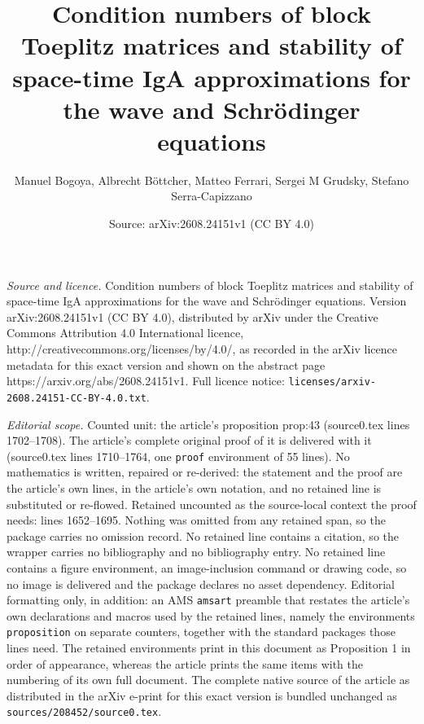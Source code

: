 \documentclass[10pt,a4paper]{amsart}
\title{Condition numbers of block Toeplitz matrices and stability of space-time IgA approximations for the wave and Schrödinger equations}
\author{Manuel Bogoya, Albrecht B\"ottcher, Matteo Ferrari, Sergei M Grudsky, Stefano Serra-Capizzano}
\date{Source: arXiv:2608.24151v1 (CC BY 4.0)}
\begin{document}
\maketitle

\noindent\emph{Source and licence.} Condition numbers of block Toeplitz matrices and stability of space-time IgA approximations for the wave and Schrödinger equations. Version arXiv:2608.24151v1 (CC BY 4.0), distributed by arXiv under the Creative Commons Attribution 4.0 International licence, http://creativecommons.org/licenses/by/4.0/, as recorded in the arXiv licence metadata for this exact version and shown on the abstract page https://arxiv.org/abs/2608.24151v1. Full licence notice: \texttt{licenses/arxiv-2608.24151-CC-BY-4.0.txt}.\par\smallskip

\noindent\textit{Editorial scope.} Counted unit: the article's proposition prop:43 (source0.tex lines 1702--1708). The article's complete original proof of it is delivered with it (source0.tex lines 1710--1764, one \texttt{proof} environment of 55 lines). No mathematics is written, repaired or re-derived: the statement and the proof are the article's own lines, in the article's own notation, and no retained line is substituted or re-flowed.  Retained uncounted as the source-local context the proof needs: lines 1652--1695.  Nothing was omitted from any retained span, so the package carries no omission record.  No retained line contains a citation, so the wrapper carries no bibliography and no bibliography entry.  No retained line contains a figure environment, an image-inclusion command or drawing code, so no image is delivered and the package declares no asset dependency.  Editorial formatting only, in addition: an AMS \texttt{amsart} preamble that restates the article's own declarations and macros used by the retained lines, namely the environments \texttt{proposition} on separate counters, together with the standard packages those lines need.  The retained environments print in this document as Proposition 1 in order of appearance, whereas the article prints the same items with the numbering of its own full document.  The complete native source of the article as distributed in the arXiv e-print for this exact version is bundled unchanged as \texttt{sources/208452/source0.tex}.
\end{document}
